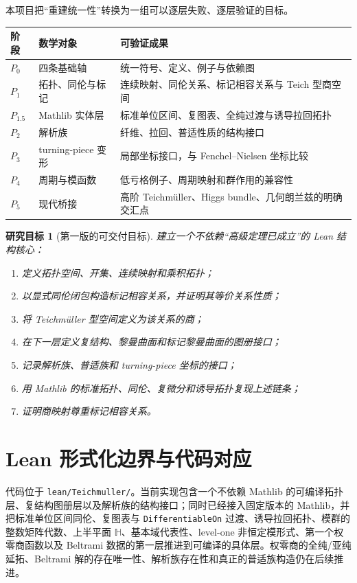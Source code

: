 \documentclass[UTF8,fontset=none,a4paper,11pt]{ctexart}
\newtheorem{researchtarget}[definition]{研究目标}
\begin{document}
本项目把“重建统一性”转换为一组可以逐层失败、逐层验证的目标。

\begin{longtable}{p{}p{}p{}}
\toprule
阶段 & 数学对象 & 可验证成果 \\
\midrule
$P_0$ & 四条基础轴 & 统一符号、定义、例子与依赖图 \\
$P_1$ & 拓扑、同伦与标记 & 连续映射、同伦关系、标记相容关系与 Teich 型商空间 \\
$P_{1.5}$ & Mathlib 实体层 & 标准单位区间、复图表、全纯过渡与诱导拉回拓扑 \\
$P_2$ & 解析族 & 纤维、拉回、普适性质的结构接口 \\
$P_3$ & turning-piece 变形 & 局部坐标接口，与 Fenchel--Nielsen 坐标比较 \\
$P_4$ & 周期与模函数 & 低亏格例子、周期映射和群作用的兼容性 \\
$P_5$ & 现代桥接 & 高阶 Teichmüller、Higgs bundle、几何朗兰兹的明确交汇点 \\
\bottomrule
\end{longtable}

\begin{researchtarget}[第一版的可交付目标]
建立一个不依赖“高级定理已成立”的 Lean 结构核心：
\begin{enumerate}[label=(\alph*)]
  \item 定义拓扑空间、开集、连续映射和乘积拓扑；
  \item 以显式同伦闭包构造标记相容关系，并证明其等价关系性质；
  \item 将 Teichmüller 型空间定义为该关系的商；
  \item 在下一层定义复结构、黎曼曲面和标记黎曼曲面的图册接口；
  \item 记录解析族、普适族和 turning-piece 坐标的接口；
  \item 用 Mathlib 的标准拓扑、同伦、复微分和诱导拓扑复现上述链条；
  \item 证明商映射尊重标记相容关系。
\end{enumerate}
\end{researchtarget}

\section{Lean 形式化边界与代码对应}

代码位于 \texttt{lean/Teichmuller/}。当前实现包含一个不依赖 Mathlib 的可编译拓扑层、复结构图册层以及解析族的结构接口；同时已经接入固定版本的 Mathlib，并把标准单位区间同伦、复图表与 \texttt{DifferentiableOn} 过渡、诱导拉回拓扑、模群的整数矩阵代数、上半平面 \(\mathbb H\)、基本域代表性、level-one 非恒定模形式、第一个权零商函数以及 Beltrami 数据的第一层推进到可编译的具体层。权零商的全纯/亚纯延拓、Beltrami 解的存在唯一性、解析族存在性和真正的普适族构造仍在后续推进。
\end{document}
